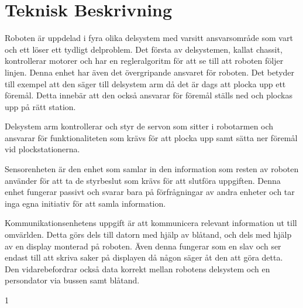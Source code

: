 
\section{Teknisk Beskrivning}

Roboten är uppdelad i fyra olika delsystem med varsitt ansvarsområde som vart och ett löser ett tydligt delproblem. Det första av delsystemen, kallat chassit, kontrollerar motorer och har en regleralgoritm för att se till att roboten följer linjen. Denna enhet har även det övergripande ansvaret för roboten. Det betyder till exempel att den säger till delsystem arm då det är dags att plocka upp ett föremål. Detta innebär att den också ansvarar för föremål ställs ned och plockas upp på rätt station.

Delsystem arm kontrollerar och styr de servon som sitter i robotarmen och ansvarar för funktionaliteten som krävs för att plocka upp samt sätta ner föremål vid plockstationerna.

Sensorenheten är den enhet som samlar in den information som resten av roboten använder för att ta de styrbeslut som krävs för att slutföra uppgiften. Denna enhet fungerar passivt och svarar bara på förfrågningar av andra enheter och tar inga egna initiativ för att samla information.

Kommunikationsenhetens uppgift är att kommunicera relevant information ut till omvärlden. Detta görs dels till datorn med hjälp av blåtand, och dels med hjälp av en display monterad på roboten. Även denna fungerar som en slav och ser endast till att skriva saker på displayen då någon säger åt den att göra detta. Den vidarebefordrar också data korrekt mellan robotens delsystem och en persondator via bussen samt blåtand.

1

